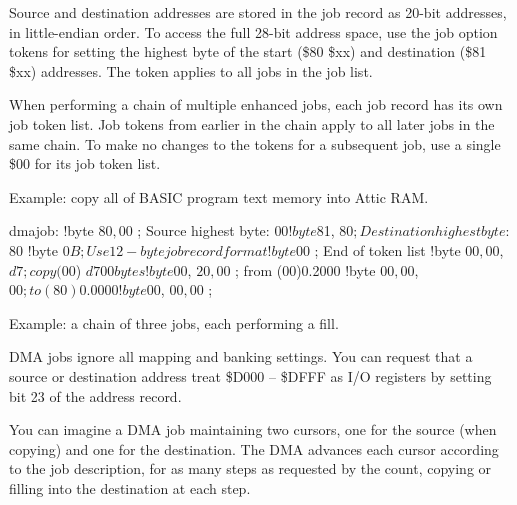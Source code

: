 Source and destination addresses are stored in the job record as 20-bit addresses, in little-endian order. To access the full 28-bit address space, use the job option tokens for setting the highest byte of the start (\$80 \$xx) and destination (\$81 \$xx) addresses. The token applies to all jobs in the job list.

When performing a chain of multiple enhanced jobs, each job record has its own job token list. Job tokens from earlier in the chain apply to all later jobs in the same chain. To make no changes to the tokens for a subsequent job, use a single \$00 for its job token list.

Example: copy all of BASIC program text memory into Attic RAM.

\begin{asmcode}
dmajob:
!byte $80, $00       ; Source highest byte: $00
!byte $81, $80       ; Destination highest byte: $80
!byte $0B            ; Use 12-byte job record format
!byte $00            ; End of token list
!byte $00, $00, $d7  ; copy ($00) $d700 bytes
!byte $00, $20, $00  ; from (00)0.2000
!byte $00, $00, $00  ; to (80)0.0000
!byte $00, $00, $00  ;
\end{asmcode}

Example: a chain of three jobs, each performing a fill.


DMA jobs ignore all mapping and banking settings. You can request that a source or destination address treat \$D000 -- \$DFFF as I/O registers by setting bit 23 of the address record.

You can imagine a DMA job maintaining two cursors, one for the source (when copying) and one for the destination. The DMA advances each cursor according to the job description, for as many steps as requested by the count, copying or filling into the destination at each step.

